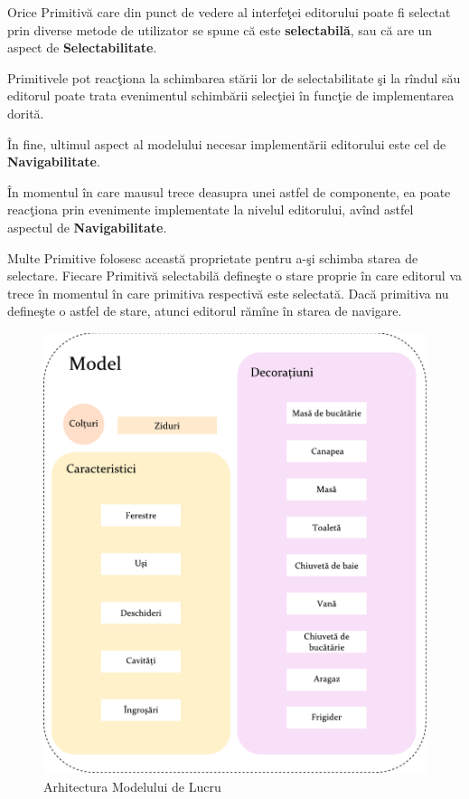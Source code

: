 \begin{definition}
\label{define:selectable}
Orice Primitivă care din punct de vedere al interfeţei editorului poate fi 
selectat prin diverse metode de utilizator se spune că este 
\textbf{selectabilă}, sau că are un aspect de \textbf{Selectabilitate}.
\end{definition}

Primitivele pot reacţiona la schimbarea stării lor de selectabilitate şi la 
rîndul său editorul poate trata evenimentul schimbării selecţiei în funcţie de 
implementarea dorită.

În fine, ultimul aspect al modelului necesar implementării editorului este cel 
de \textbf{Navigabilitate}.

\begin{definition}
\label{define:hoverable}
În momentul în care mausul trece deasupra unei 
astfel de componente, ea poate reacţiona prin evenimente implementate la 
nivelul editorului, avînd astfel aspectul de \textbf{Navigabilitate}.
\end{definition}

Multe Primitive folosesc această proprietate pentru a-şi schimba starea de 
selectare. Fiecare Primitivă selectabilă defineşte o stare proprie în care
editorul va trece în momentul în care primitiva respectivă este selectată. Dacă
primitiva nu defineşte o astfel de stare, atunci editorul rămîne în starea de
navigare.

\begin{figure}[htp]
\begin{center} 
\includegraphics[width=\textwidth]{figures/model.pdf} \caption{Arhitectura 
Modelului de Lucru}
  \label{figure:model-arh}
\end{center}
\end{figure}


